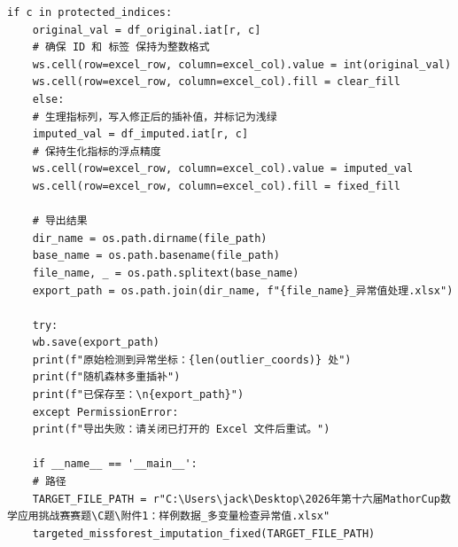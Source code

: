 \documentclass[12pt]{article}
\begin{document}
\begin{lstlisting}[caption={随机森林多重插补异常值处理}, label={code:missforest_impute}]
	if c in protected_indices:
	original_val = df_original.iat[r, c]
	# 确保 ID 和 标签 保持为整数格式
	ws.cell(row=excel_row, column=excel_col).value = int(original_val)
	ws.cell(row=excel_row, column=excel_col).fill = clear_fill
	else:
	# 生理指标列，写入修正后的插补值，并标记为浅绿
	imputed_val = df_imputed.iat[r, c]
	# 保持生化指标的浮点精度
	ws.cell(row=excel_row, column=excel_col).value = imputed_val
	ws.cell(row=excel_row, column=excel_col).fill = fixed_fill
	
	# 导出结果
	dir_name = os.path.dirname(file_path)
	base_name = os.path.basename(file_path)
	file_name, _ = os.path.splitext(base_name)
	export_path = os.path.join(dir_name, f"{file_name}_异常值处理.xlsx")
	
	try:
	wb.save(export_path)
	print(f"原始检测到异常坐标：{len(outlier_coords)} 处")
	print(f"随机森林多重插补")
	print(f"已保存至：\n{export_path}")
	except PermissionError:
	print(f"导出失败：请关闭已打开的 Excel 文件后重试。")
	
	if __name__ == '__main__':
	# 路径
	TARGET_FILE_PATH = r"C:\Users\jack\Desktop\2026年第十六届MathorCup数学应用挑战赛赛题\C题\附件1：样例数据_多变量检查异常值.xlsx"
	targeted_missforest_imputation_fixed(TARGET_FILE_PATH)
\end{lstlisting}
\end{document}
